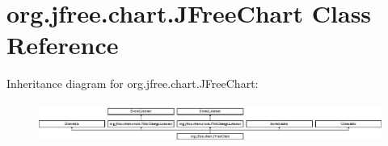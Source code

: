 \hypertarget{classorg_1_1jfree_1_1chart_1_1_j_free_chart}{}\section{org.\+jfree.\+chart.\+J\+Free\+Chart Class Reference}
\label{classorg_1_1jfree_1_1chart_1_1_j_free_chart}
Inheritance diagram for org.\+jfree.\+chart.\+J\+Free\+Chart\+:\begin{figure}[H]
\begin{center}
\leavevmode
\includegraphics[height=1.328063cm]{classorg_1_1jfree_1_1chart_1_1_j_free_chart}
\end{center}
\end{figure}
